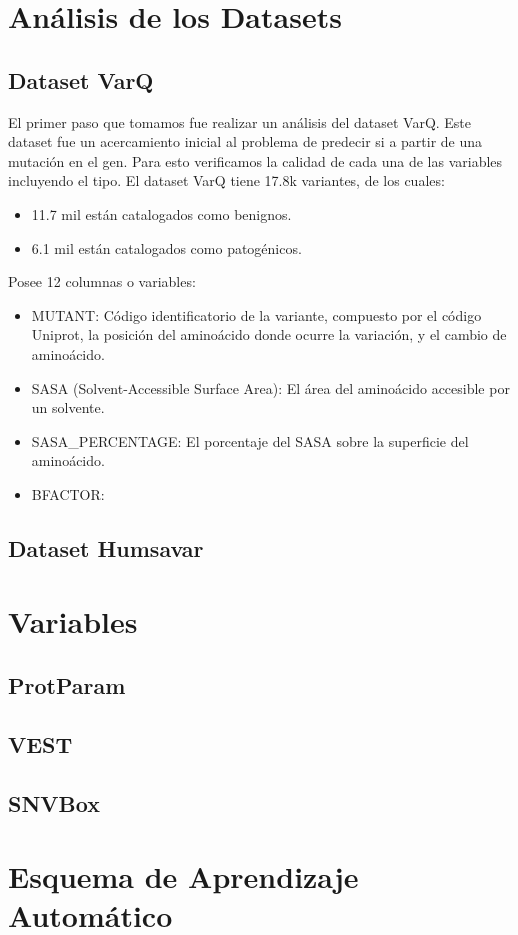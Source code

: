 \section{Análisis de los Datasets}

\subsection{Dataset VarQ}

El primer paso que tomamos fue realizar un análisis del dataset VarQ. Este dataset fue un acercamiento inicial al problema de predecir si a partir de una mutación en el gen. Para esto verificamos la calidad de cada una de las variables incluyendo el tipo. El dataset VarQ tiene 17.8k variantes, de los cuales:

\begin{itemize}
    \item 11.7 mil están catalogados como benignos.
    \item 6.1 mil están catalogados como patogénicos.
\end{itemize}

Posee 12 columnas o variables: 

\begin{itemize}
    \item MUTANT: Código identificatorio de la variante, compuesto por el código Uniprot, la posición del aminoácido donde ocurre la variación, y el cambio de aminoácido.
    \item SASA (Solvent-Accessible Surface Area): El área del aminoácido accesible por un solvente.
    \item SASA\_PERCENTAGE: El porcentaje del SASA sobre la superficie del aminoácido.
    \item BFACTOR: 
    
\end{itemize}

\subsection{Dataset Humsavar}


\section{Variables}

\subsection{ProtParam}

\subsection{VEST}

\subsection{SNVBox}


\section{Esquema de Aprendizaje Automático}